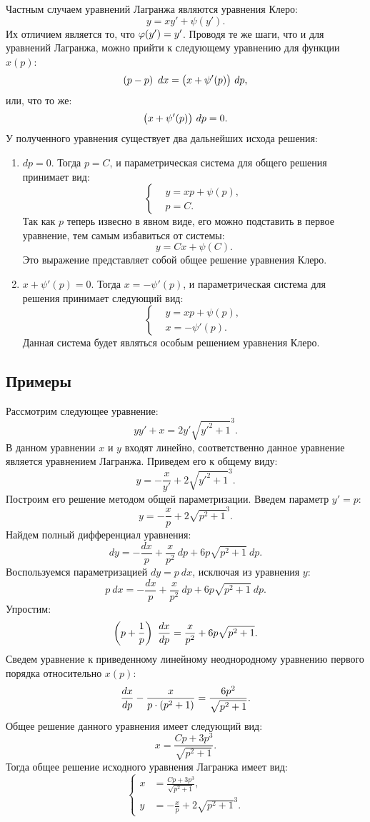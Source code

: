 	Частным случаем уравнений Лагранжа являются уравнения Клеро:
	\[ y = xy' + \psi(y'). \]
	Их отличием является то, что $\varphi(y') = y'$. Проводя те же шаги, что и для уравнений Лагранжа, можно прийти к следующему уравнению для функции $x(p)$:
	\[ \left( p - p \right) ~ dx = \bigl( x + \psi'(p) \bigr) ~ dp, \]
	или, что то же:
	\[ \bigl( x + \psi'(p) \bigr) ~ dp = 0. \]
	У полученного уравнения существует два дальнейших исхода решения:
	\begin{enumerate}
		\item $dp = 0$. Тогда $p = C$, и параметрическая система для общего решения принимает вид:
			\[ \left\lbrace \begin{split} &y = xp + \psi(p), \\ &p = C. \end{split} \right. \]
			Так как $p$ теперь извесно в явном виде, его можно подставить в первое уравнение, тем самым избавиться от системы:
			\[ y = Cx + \psi(C). \]
			Это выражение представляет собой общее решение уравнения Клеро.
		\item $x + \psi'(p) = 0$. Тогда $x = - \psi'(p)$, и параметрическая система для решения принимает следующий вид:
			\[ \left\lbrace \begin{split} &y = xp + \psi(p), \\ &x = - \psi'(p). \end{split} \right. \]
			Данная система будет являться особым решением уравнения Клеро.
	\end{enumerate}

	\subsection{Примеры}

		Рассмотрим следующее уравнение:
		\[ yy' + x = 2 y' \sqrt{y'^2 + 1}^3. \]
		В данном уравнении $x$ и $y$ входят линейно, соответственно данное уравнение является уравнением Лагранжа. Приведем его к общему виду:
		\[ y = - \frac{x}{y'} + 2 \sqrt{y'^2 + 1}^3. \]
		Построим его решение методом общей параметризации. Введем параметр $y' = p$:
		\[ y = - \frac{x}{p} + 2 \sqrt{p^2 + 1}^3. \]
		Найдем полный дифференциал уравнения:
		\[ dy = -\frac{dx}{p} + \frac{x}{p^2} ~ dp + 6p \sqrt{p^2 + 1} ~ dp. \]
		Воспользуемся параметризацией $dy = p ~ dx$, исключая из уравнения $y$:
		\[ p ~ dx = - \frac{dx}{p} + \frac{x}{p^2} ~ dp + 6p \sqrt{p^2 + 1} ~ dp. \]
		Упростим:
		\[ \left( p + \frac{1}{p} \right) ~ \dfrac{d x}{d p} = \frac{x}{p^2} + 6p \sqrt{p^2 + 1}. \]
		Сведем уравнение к приведенному линейному неоднородному уравнению первого порядка относительно $x(p)$:
		\[ \dfrac{d x}{d p} - \frac{x}{p \cdot \left( p^2 + 1 \right)} = \frac{6p^2 }{\sqrt{p^2 + 1}}. \]
		Общее решение данного уравнения имеет следующий вид:
		\[ x = \frac{Cp + 3p^3}{\sqrt{p^2 + 1}}. \]
		Тогда общее решение исходного уравнения Лагранжа имеет вид:
		\[ \left\lbrace \begin{split} 
			x &= \frac{Cp + 3p^3}{\sqrt{p^2 + 1}}, \\
			y &= - \frac{x}{p} + 2 \sqrt{p^2 + 1}^3.
		\end{split} \right. \]

